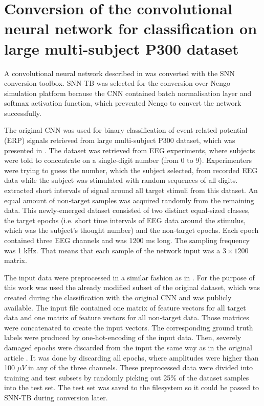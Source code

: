 \chapter{Conversion of the convolutional neural network for classification on large multi-subject P300 dataset} \label{chap:06}

A convolutional neural network described in \cite{varekaEvaluationConvolutional20} was converted with the SNN conversion toolbox. SNN-TB was selected for the conversion over Nengo simulation platform because the CNN contained batch normalisation layer and softmax activation function, which prevented Nengo to convert the network successfully. \par
The original CNN was used for binary classification of event-related potential (ERP) signals retrieved from large multi-subject P300 dataset, which was presented in \cite{moucekEventrelatedPotential17}. The dataset was retrieved from EEG experiments, where subjects were told to concentrate on a single-digit number (from 0 to 9). Experimenters were trying to guess the number, which the subject selected, from recorded EEG data while the subject was stimulated with random sequences of all digits. \cite{varekaEvaluationConvolutional20} extracted short intervals of signal around all target stimuli from this dataset. An equal amount of non-target samples was acquired randomly from the remaining data. This newly-emerged dataset consisted of two distinct equal-sized classes, the target epochs (i.e. short time intervals of EEG data around the stimulus, which was the subject's thought number) and the non-target epochs. Each epoch contained three EEG channels and was 1200 ms long. The sampling frequency was 1 kHz. That means that each sample of the network input was a $3 \times 1200$ matrix. \par
The input data were preprocessed in a similar fashion as in \cite{varekaEvaluationConvolutional20}. For the purpose of this work was used the already modified subset \cite{moucekReplicationData19} of the original dataset, which was created during the classification with the original CNN and was publicly available. The input file contained one matrix of feature vectors for all target data and one matrix of feature vectors for all non-target data. Those matrices were concatenated to create the input vectors. The corresponding ground truth labels were produced by one-hot-encoding of the input data. Then, severely damaged epochs were discarded from the input the same way as in the original article \cite{varekaEvaluationConvolutional20}. It was done by discarding all epochs, where amplitudes were higher than 100 $\mu V$ in any of the three channels. These preprocessed data were divided into training and test subsets by randomly picking out 25\% of the dataset samples into the test set. The test set was saved to the filesystem so it could be passed to SNN-TB during conversion later. \par
